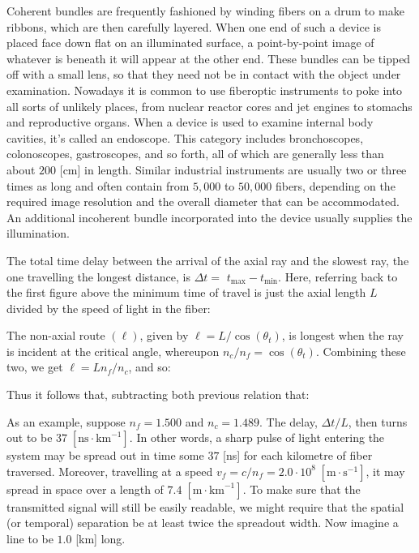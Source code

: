 	Coherent bundles are frequently fashioned by winding fibers on a drum to make ribbons, which are then carefully layered. When one end of such a device is placed face down flat on an illuminated surface, a point-by-point image of whatever is beneath it will appear at the other end. These bundles can be tipped off with a small lens, so that they need not be in contact with the object under examination. Nowadays it is common to use fiberoptic instruments to poke into all sorts of unlikely places, from nuclear reactor cores and jet engines to stomachs and reproductive organs. When a device is used to examine internal body cavities, it's called an endoscope. This category includes bronchoscopes, colonoscopes, gastroscopes, and so forth, all of which are generally less than about $200$ [cm] in length. Similar industrial instruments are usually two or three times as long and often contain from $5,000$ to $50,000$ fibers, depending on the required image resolution and the overall diameter that can be accommodated. An additional incoherent bundle incorporated into the device usually supplies the illumination.
	
	The total time delay between the arrival of the axial ray and the slowest ray, the one travelling the longest distance, is $\Delta t=$ $t_{\max }-t_{\min } .$ Here, referring back to the first figure above the minimum time of travel is just the axial length $L$ divided by the speed of light in the fiber:
	
	The non-axial route $(\ell)$, given by $\ell=L / \cos (\theta_{t})$, is longest when the ray is incident at the critical angle, whereupon $n_{c} / n_{f}=\cos (\theta_{t})$. Combining these two, we get $\ell=Ln_{f} / n_{c}$, and so:
	
	Thus it follows that, subtracting both previous relation that:
	
	As an example, suppose $n_{f}=1.500$ and $n_{c}=1.489$. The delay, $\Delta t / L$, then turns out to be $37\; [\text{ns}\cdot \text{km}^{-1}]$. In other words, a sharp pulse of light entering the system may be spread out in time some $37$ [ns] for each kilometre of fiber traversed. Moreover, travelling at a speed $v_{f}=c / n_{f}=2.0 \cdot 10^{8}\; [\text{m}\cdot \text{s}^{-1}]$, it may spread in space over a length of $7.4\;[\text{m}\cdot \text{km}^{-1}]$. To make sure that the transmitted signal will still be easily readable, we might require that the spatial (or temporal) separation be at least twice the spreadout width. Now imagine a line to be $1.0$ [km] long.


